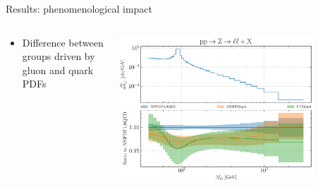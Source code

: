 \documentclass[aspectratio=169, 8pt,t]{beamer}
\begin{document}
\begin{frame}{Results: phenomenological impact}
\begin{columns}[T]
\begin{column}{0.59\textwidth}
\begin{itemize}
        \item Difference between groups driven by gluon and quark PDFs
      \end{itemize}
    \end{column}
    \begin{column}{0.39\textwidth}
      \vspace*{-5em}
      \includegraphics[width=0.8\textwidth]{figures/NNPDF_DY_14TEV_40_PHENO-global.pdf}
    \end{column}
  \end{columns}
\end{frame}
\end{document}
